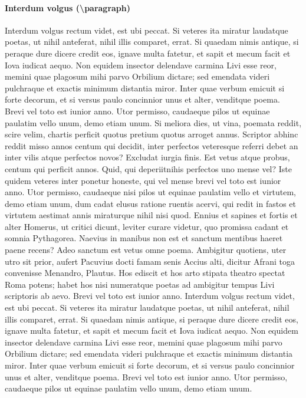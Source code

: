 \documentclass[nochapterpage,bigchapter,linedtoc,longdoc,colorback,accentcolor=tud4c]{tudreport}
\begin{document}
  \paragraph{Interdum volgus (\textbackslash paragraph)}

    Interdum volgus rectum videt, est ubi peccat. Si veteres ita miratur laudatque poetas, ut nihil anteferat, nihil illis comparet, errat.  Si quaedam nimis antique, si peraque dure dicere credit eos, ignave multa fatetur, et sapit et mecum facit et Iova iudicat aequo. Non equidem insector delendave carmina Livi esse reor, memini quae plagosum mihi parvo Orbilium dictare; sed emendata videri pulchraque et exactis minimum distantia miror. Inter quae verbum emicuit si forte decorum, et si versus paulo concinnior unus et alter, venditque poema. Brevi vel toto est iunior anno. Utor permisso, caudaeque pilos ut equinae paulatim vello unum, demo etiam unum. Si meliora dies, ut vina, poemata reddit, scire velim, chartis perficit quotus pretium quotus arroget annus. Scriptor abhinc reddit misso annos centum qui decidit, inter perfectos veteresque referri debet an inter vilis atque perfectos novos? Excludat iurgia finis. Est vetus atque probus, centum qui perficit annos. Quid, qui deperiitnihis perfectos uno mense vel? Iste quidem veteres inter ponetur honeste, qui vel mense brevi vel toto est iunior anno.
    Utor permisso, caudaeque nisi pilos ut equinae paulatim vello et virtutem, demo etiam unum, dum cadat elusus ratione ruentis acervi, qui redit in fastos et virtutem aestimat annis miraturque nihil nisi quod. Ennius et sapines et fortis et alter Homerus, ut critici dicunt, leviter curare videtur, quo promissa cadant et somnia Pythagorea.  Naevius in manibus non est et sanctum mentibus haeret paene recens? 
    Adeo sanctum est vetus omne poema. Ambigitur quotiens, uter utro sit prior, aufert Pacuvius docti famam senis Accius alti, dicitur Afrani toga convenisse Menandro, Plautus. Hos ediscit et hos arto stipata theatro spectat Roma potens; habet hos nisi numeratque poetas ad ambigitur tempus Livi scriptoris ab aevo. Brevi vel toto est iunior anno. Interdum volgus rectum videt, est ubi peccat. Si veteres ita miratur laudatque poetas, ut nihil anteferat, nihil illis comparet, errat.  Si quaedam nimis antique, si peraque dure dicere credit eos, ignave multa fatetur, et sapit et mecum facit et Iova iudicat aequo. Non equidem insector delendave carmina Livi esse reor, memini quae plagosum mihi parvo Orbilium dictare; sed emendata videri pulchraque et exactis minimum distantia miror. Inter quae verbum emicuit si forte decorum, et si versus paulo concinnior unus et alter, venditque poema. Brevi vel toto est iunior anno. Utor permisso, caudaeque pilos ut equinae paulatim vello unum, demo etiam unum.
\end{document}
